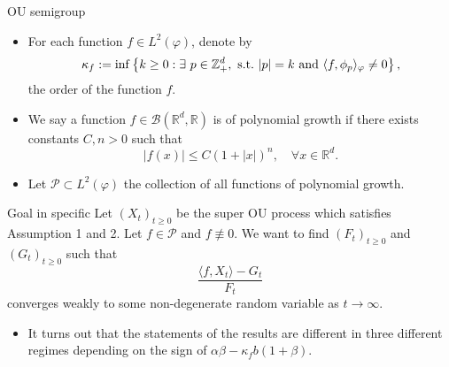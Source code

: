 \documentclass[9pt]{beamer}
\begin{document}
\begin{frame}[allowframebreaks]{OU semigroup}
\begin{itemize}
\begin{lemma}
	$(P_t)_{t\geq 0}$ is a strongly continuous semigroup in $L^2(\varphi)$ and its generator $L$ has discrete spectrum $\sigma(L)= \{-bk: k \in \mathbb Z_+\}$.
    For each $k \in \mathbb Z_+$, denote by $\mathcal{A}_k$ the eigenspace corresponding to the eigenvalue $-bk$, then
\[
    \mathcal{A}_k
    = \operatorname{Span} \{\phi_p : p\in \mathbb Z_+^d, |p|=k\},
\]
    where
\begin{equation}\label{eigenfunction}
    \phi_p(x)
    := \frac{1}{\sqrt{ p! 2^{|p|} }} H_p \Big(\frac{ \sqrt{b} }{\sigma}x \Big),
    \quad x\in \mathbb R^d, p\in \mathbb Z_+^d.
\end{equation}
	Moreover, $\{\phi_p:p\in \mathbb Z_+^d\}$ forms a complete orthonormal basis for $L^2(\varphi)$.
\end{lemma}
\item
    For each function $f\in L^2(\varphi)$, denote by
\begin{equation}
    \kappa_f
    :=\inf \left \{k\geq 0: \exists ~ p\in \mathbb Z_+^d ,{\rm ~s.t.~}|p|=k {\rm ~and~}  \langle f, \phi_p \rangle_{\varphi}\neq 0\right \},
\end{equation}
    the order of the function $f$. 
\item
	We say a function $f\in \mathcal B(\mathbb R^d, \mathbb R)$ is of polynomial growth if there exists constants $C,n>0$ such that 
\[
	|f(x)|\leq C(1+|x|)^n,
	\quad \forall x\in \mathbb R^d.
\]
\item
    Let $\mathcal P \subset L^2(\varphi)$ the collection of all functions of polynomial growth.
\end{itemize}
\begin{block}{Goal in specific}
	Let $(X_t)_{t\geq 0}$ be the super OU process which satisfies Assumption 1 and 2.
	Let $f\in \mathcal P$ and $f\not \equiv 0$.
	We want to find
    $(F_t)_{t\geq 0}$ and $(G_t)_{t\geq 0}$ such that
\[
    \frac{\langle f, X_t \rangle -G_t}{F_t}
\]
    converges weakly to some non-degenerate random variable as $t\rightarrow\infty$.
\end{block}
\begin{itemize}
\item
	It turns out that the statements of the results are different in three different regimes
    depending on the sign of $\alpha\beta-\kappa_f b (1+\beta)$.
\end{itemize}
\end{frame}
\end{document}
